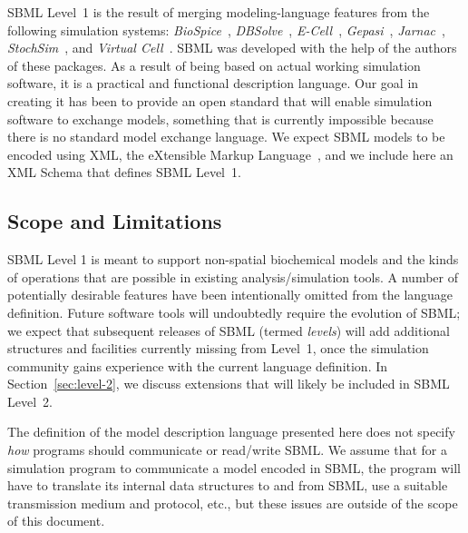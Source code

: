 \documentclass[10pt]{cekarticle}
\begin{document}
SBML Level~1 is the result of merging modeling-language features from the
following simulation systems: \emph{BioSpice}~\citep{arkin:2001},
\emph{DBSolve}~\citep{goryanin:2001,goryanin:1999},
\emph{E-Cell}~\citep{tomita:1999,tomita:2001},
\emph{Gepasi}~\citep{mendes:1997,mendes:2001},
\emph{Jarnac}~\citep{sauro:2000,sauro:1991},
\emph{StochSim}~\citep{bray:2001,morton-firth:1998}, and \emph{Virtual
  Cell}~\citep{schaff:2000,schaff:2001}.  SBML was developed with the help
of the authors of these packages.  As a result of being based on actual
working simulation software, it is a practical and functional description
language.  Our goal in creating it has been to provide an open standard
that will enable simulation software to exchange models, something that is
currently impossible because there is no standard model exchange language.
We expect SBML models to be encoded using XML, the eXtensible Markup
Language~\citep{bosak:1999,bray:1998}, and we include here an XML Schema
that defines SBML Level~1.


\subsection{Scope and Limitations}

SBML Level 1 is meant to support non-spatial biochemical models and the
kinds of operations that are possible in existing analysis/simulation
tools.  A number of potentially desirable features have been intentionally
omitted from the language definition.  Future software tools will
undoubtedly require the evolution of SBML; we expect that subsequent
releases of SBML (termed \emph{levels}) will add additional structures and
facilities currently missing from Level~1, once the simulation community
gains experience with the current language definition.  In
Section~\ref{sec:level-2}, we discuss extensions that will likely be
included in SBML Level~2.

The definition of the model description language presented here does not
specify \emph{how} programs should communicate or read/write SBML.  We
assume that for a simulation program to communicate a model encoded in
SBML, the program will have to translate its internal data structures to
and from SBML, use a suitable transmission medium and protocol, etc., but
these issues are outside of the scope of this document.
\end{document}
